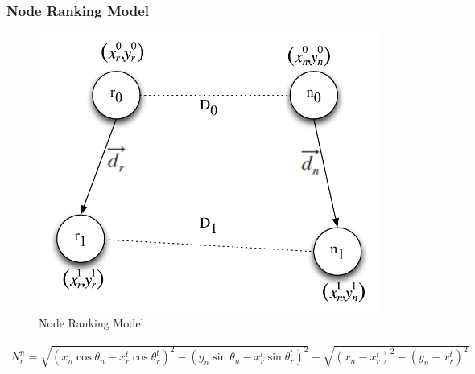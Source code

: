 \documentclass{beamer}
\begin{document}
\begin{frame}
	\frametitle{Node Ranking Model}
\begin{figure}
\centering
\includegraphics[width=0.5\linewidth]{Figures_Present/Fig3}
\caption{Node Ranking Model}
\label{fig:Fig3}
\end{figure}
{\tiny \begin{eqnarray}
{ N }_{ r }^{ n }=\sqrt { { ({ x }_{ n }\cos { { \theta  }_{ n } } -{ x }_{ r }^{ t }\cos { { \theta  }_{ r }^{ t } } ) }^{ 2 }-{ ({ y }_{ n }\sin { { \theta  }_{ n } } -{ x }_{ r }^{ t }\sin { { \theta  }_{ r }^{ t } } ) }^{ 2 } } -\sqrt { { ({ x }_{ n }-{ x }_{ r }^{ t }) }^{ 2 }-{ ({ y }_{ n }-{ x }_{ r }^{ t }) }^{ 2 } } 
\end{eqnarray}}
\end{frame}
\end{document}
